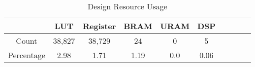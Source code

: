 \appendix


\begin{table}[H]
	\centering
	\begin{tabular}{c|ccccccccc}
		& \textbf{LUT} & \textbf{Register} & \textbf{BRAM} & \textbf{URAM} & \textbf{DSP} \\
		\hline
		Count & 38,827 & 38,729 & 24 & 0 & 5 \\
		Percentage & 2.98 & 1.71 & 1.19 & 0.0 & 0.06 \\
	\end{tabular}
	\caption{Design Resource Usage}
	\label{table:resource-usage}
\end{table}
